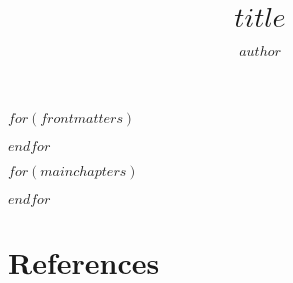 \documentclass[nemilov1]{Nemilov}
\begin{document}
\frontmatter



\title{$title$}


\author{$author$}

\maketitle

\setcounter{page}{5}


\tableofcontents

$for(frontmatters)$

$endfor$


\mainmatter


$for(mainchapters)$

$endfor$

%
%

\appendix

%

\cleardoublepage

\chapter*{References}



\cleardoublepage
\printindex
\cleardoublepage


\clearpage


\end{document}
